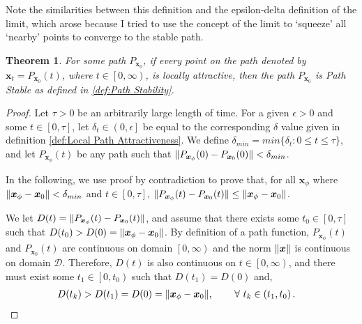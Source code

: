 \documentclass{article}
\newcommand{\B}[1]{\boldsymbol{#1}}
\DeclarePairedDelimiter\norm{\lVert}{\rVert}%
\newtheorem{theorem}{Theorem}[section]
\theoremstyle{definition}
\theoremstyle{remark}
\begin{document}
Note the similarities between this definition and the epsilon-delta definition of the limit, which
arose because I tried to use the concept of the limit to `squeeze' all 
`nearby' points to converge to the stable path.

\begin{theorem}
  \label{Attractiveness Stability}
  For some path $P_{\B{x}_0}$, if every point on the path denoted by
  $\B{x}_t = P_{\B{x}_0}(t)$, where $t \in \left[0, \infty \right)$, is locally attractive,
  then the path $P_{\B{x}_0}$ is Path Stable as defined in \ref{def:Path Stability}.
\end{theorem}

\begin{proof}
  Let $\tau > 0$ be an arbitrarily large length of time.
  For a given $\epsilon > 0$ and some $t \in [0, \tau]$, let $\delta_t \in \left(0,\epsilon\right]$ be equal to the
  corresponding $\delta$ value given in definition \ref{def:Local Path Attractiveness}.
  We define $\delta_{min} = min\{ \delta_t: 0 \leq t \leq \tau\}$, and let $P_{\B{x}_\phi}(t)$ be any path such that $\norm{P_{\B{x}_\phi}(0)-P_{\B{x}_0}(0)} < \delta_{min}$.

  In the following, we use proof by contradiction to prove that, for all $\B{x}_\phi$ where $\norm{\B{x}_\phi - \B{x}_0} < \delta_{min}$ and $t \in [0, \tau]$, $\norm{P_{\B{x}_\phi}(t)-P_{\B{x}_0}(t)} \leq \norm{\B{x}_\phi - \B{x}_0}$.

  We let $D(t) = \norm{P_{\B{x}_\phi}(t)-P_{\B{x}_0}(t)}$, and assume that there exists
  some $t_0 \in [0, \tau]$ such that $D(t_0) > D(0) = \norm{\B{x}_\phi - \B{x}_0}$.
  By definition of a path function, $P_{\B{x}_\phi}(t)$ and $P_{\B{x}_0}(t)$ are continuous on domain
  $\left[0, \infty\right)$ and the norm $\norm{\B{x}}$ is continuous on domain $\mathcal{D}$.
  Therefore, $D(t)$ is also continuous on $t \in \left[0, \infty\right)$, and there must exist some $t_1 \in \left[0, t_0\right)$
  such that $D(t_1) = D(0)$ and,
  \begin{align}
  D(t_k) > D(t_1) = D(0) = \norm{\B{x}_\phi - \B{x}_0}, ~~~~~~~ &\forall ~t_k \in \left(t_1, t_0\right).  \label{contradiction}
  \end{align}


\end{proof}
\end{document}
